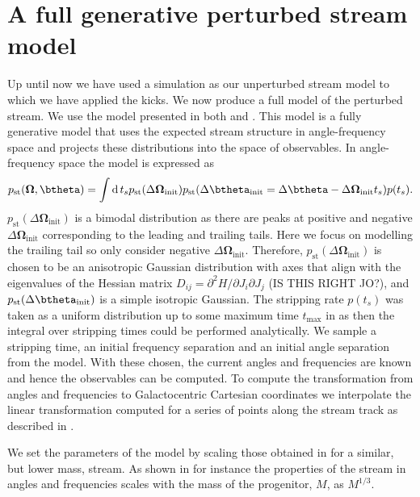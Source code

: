 \documentclass[useAMS,usenatbib,fleqn,a4paper]{mn2e}
\def\d{{\rm d}}
\begin{document}
\section{A full generative perturbed stream model}
Up until now we have used a simulation as our unperturbed stream model to which we have applied the kicks. We now produce a full model of the perturbed stream. We use the model presented in both \cite{Bovy2014} and \cite{Sanders2014}. This model is a fully generative model that uses the expected stream structure in angle-frequency space and projects these distributions into the space of observables. In angle-frequency space the model is expressed as
\begin{equation}
p_\mathrm{st}(\boldsymbol{\Omega},\btheta) = \int\d\,t_s p_\mathrm{st}(\Delta\boldsymbol{\Omega}_\mathrm{init}) p_\mathrm{st}(\Delta\btheta_\mathrm{init}=\Delta\btheta-\Delta\boldsymbol{\Omega}_\mathrm{init}t_s)p(t_s).
\end{equation}
$p_\mathrm{st}(\Delta\boldsymbol{\Omega}_\mathrm{init})$ is a bimodal distribution as there are peaks at positive and negative $\Delta\boldsymbol{\Omega}_\mathrm{init}$ corresponding to the leading and trailing tails. Here we focus on modelling the trailing tail so only consider negative $\Delta\boldsymbol{\Omega}_\mathrm{init}$. Therefore, $p_\mathrm{st}(\Delta\boldsymbol{\Omega}_\mathrm{init})$ is chosen to be an anisotropic Gaussian distribution with axes that align with the eigenvalues of the Hessian matrix $D_{ij}=\partial^2H/\partial J_i\partial J_j$ (IS THIS RIGHT JO?), and $p_\mathrm{st}(\Delta\btheta_\mathrm{init})$ is a simple isotropic Gaussian. The stripping rate $p(t_s)$ was taken as a uniform distribution up to some maximum time $t_\mathrm{max}$ in \cite{Bovy2014} as then the integral over stripping times could be performed analytically. We sample a stripping time, an initial frequency separation and an initial angle separation from the model. With these chosen, the current angles and frequencies are known and hence the observables can be computed. To compute the transformation from angles and frequencies to Galactocentric Cartesian coordinates we interpolate the linear transformation computed for a series of points along the stream track as described in \cite{Bovy2014}.

We set the parameters of the model by scaling those obtained in \cite{Bovy2014} for a similar, but lower mass, stream. As shown in \cite{SandersBinney2013a} for instance the properties of the stream in angles and frequencies scales with the mass of the progenitor, $M$, as $M^{1/3}$.
\end{document}
